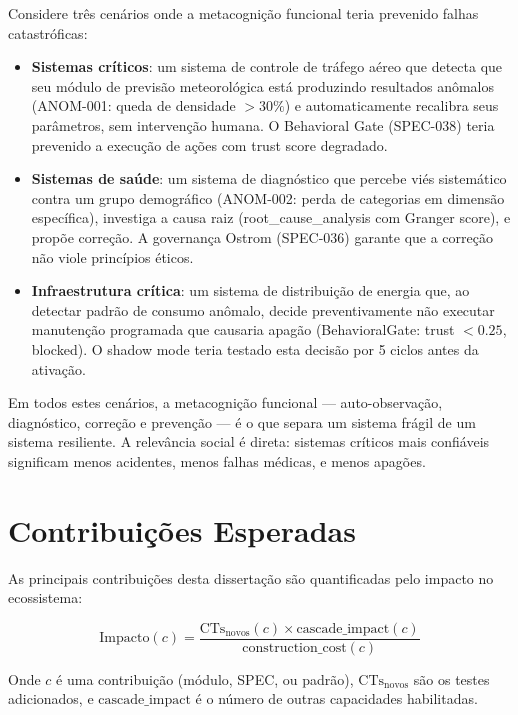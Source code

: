 Considere três cenários onde a metacognição funcional teria prevenido falhas catastróficas:

\begin{itemize}
    \item \textbf{Sistemas críticos}: um sistema de controle de tráfego aéreo que detecta que seu módulo de previsão meteorológica está produzindo resultados anômalos (ANOM-001: queda de densidade $>30\%$) e automaticamente recalibra seus parâmetros, sem intervenção humana. O Behavioral Gate (SPEC-038) teria prevenido a execução de ações com trust score degradado.
    
    \item \textbf{Sistemas de saúde}: um sistema de diagnóstico que percebe viés sistemático contra um grupo demográfico (ANOM-002: perda de categorias em dimensão específica), investiga a causa raiz (root\_cause\_analysis com Granger score), e propõe correção. A governança Ostrom (SPEC-036) garante que a correção não viole princípios éticos.
    
    \item \textbf{Infraestrutura crítica}: um sistema de distribuição de energia que, ao detectar padrão de consumo anômalo, decide preventivamente não executar manutenção programada que causaria apagão (BehavioralGate: trust $< 0.25$, blocked). O shadow mode teria testado esta decisão por 5 ciclos antes da ativação.
\end{itemize}

Em todos estes cenários, a metacognição funcional — auto-observação, diagnóstico, correção e prevenção — é o que separa um sistema frágil de um sistema resiliente. A relevância social é direta: sistemas críticos mais confiáveis significam menos acidentes, menos falhas médicas, e menos apagões.

\section{Contribuições Esperadas}

As principais contribuições desta dissertação são quantificadas pelo impacto no ecossistema:

\begin{equation}
\text{Impacto}(c) = \frac{\text{CTs}_{\text{novos}}(c) \times \text{cascade\_impact}(c)}{\text{construction\_cost}(c)}
\label{eq:impacto}
\end{equation}

Onde $c$ é uma contribuição (módulo, SPEC, ou padrão), $\text{CTs}_{\text{novos}}$ são os testes adicionados, e $\text{cascade\_impact}$ é o número de outras capacidades habilitadas.


